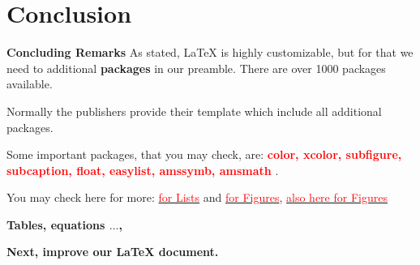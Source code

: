 \documentclass[xcolor=dvipsnames]{beamer}
\begin{document}
\section{Conclusion}
\begin{frame}{\textbf{Concluding Remarks}}
\justifying
As stated, \LaTeX{} is highly customizable, but for that we need to additional \textbf{packages} in our preamble. There are over 1000 packages available.\\

\vspace{0.4cm}

Normally the publishers provide their template which include all additional packages.\\

\vspace{0.4cm}

Some important packages, that you may check, are: \textcolor{red}{\textbf{color, xcolor, subfigure, subcaption, float, easylist, amssymb, amsmath }}.\\
\vspace{0.3cm}

You may check here for more: \href{http://en.wikibooks.org/wiki/LaTeX/List_Structures}{\textcolor{red}{for Lists}} and \href{http://en.wikibooks.org/wiki/LaTeX/Floats,_Figures_and_Captions}{\textcolor{red}{for Figures}}, \href{http://en.wikibooks.org/wiki/LaTeX/Importing_Graphics}{\textcolor{red}{also here for Figures}}


\end{frame}


{
\begin{frame}{\Huge \textbf{Tables, equations $\ldots$,}}
\pagestyle{plain}
\Huge

\textbf{Next, improve our \LaTeX{} document.}


\end{frame}

}
\end{document}
